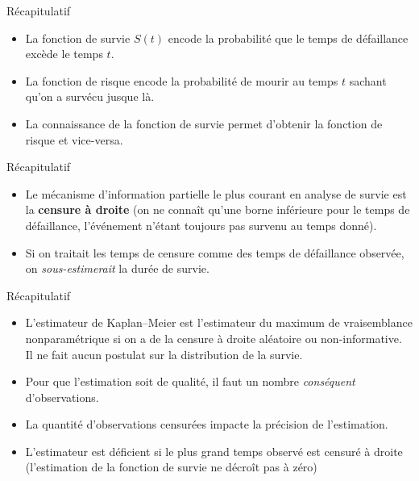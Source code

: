 \documentclass[
  ignorenonframetext,
]{beamer}
\providecommand{\tightlist}{%
  \setlength{\itemsep}{0pt}\setlength{\parskip}{0pt}}\usepackage{longtable,booktabs,array}
\begin{document}
\begin{frame}{Récapitulatif}
\protect\hypertarget{ruxe9capitulatif-1}{}
\begin{itemize}
\tightlist
\item
  La fonction de survie \(S(t)\) encode la probabilité que le temps de
  défaillance excède le temps \(t\).
\item
  La fonction de risque encode la probabilité de mourir au temps \(t\)
  sachant qu'on a survécu jusque là.
\item
  La connaissance de la fonction de survie permet d'obtenir la fonction
  de risque et vice-versa.
\end{itemize}
\end{frame}

\begin{frame}{Récapitulatif}
\protect\hypertarget{ruxe9capitulatif-2}{}
\begin{itemize}
\tightlist
\item
  Le mécanisme d'information partielle le plus courant en analyse de
  survie est la \textbf{censure à droite} (on ne connaît qu'une borne
  inférieure pour le temps de défaillance, l'événement n'étant toujours
  pas survenu au temps donné).
\item
  Si on traitait les temps de censure comme des temps de défaillance
  observée, on \emph{sous-estimerait} la durée de survie.
\end{itemize}
\end{frame}

\begin{frame}{Récapitulatif}
\protect\hypertarget{ruxe9capitulatif-3}{}
\begin{itemize}
\tightlist
\item
  L'estimateur de Kaplan--Meier est l'estimateur du maximum de
  vraisemblance nonparamétrique si on a de la censure à droite aléatoire
  ou non-informative. Il ne fait aucun postulat sur la distribution de
  la survie.
\item
  Pour que l'estimation soit de qualité, il faut un nombre
  \emph{conséquent} d'observations.
\item
  La quantité d'observations censurées impacte la précision de
  l'estimation.
\item
  L'estimateur est déficient si le plus grand temps observé est censuré
  à droite (l'estimation de la fonction de survie ne décroît pas à zéro)
\end{itemize}
\end{frame}
\end{document}
